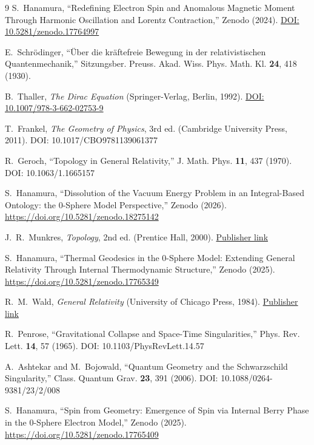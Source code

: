 \documentclass[%
 reprint,
 amsmath,amssymb,
 aps,
 prb,
]{revtex4-2}
\numberwithin{equation}{section}
\begin{document}
\begin{thebibliography}{9}
S.~Hanamura,
``Redefining Electron Spin and Anomalous Magnetic Moment Through Harmonic Oscillation and Lorentz Contraction,''
Zenodo (2024).
\href{https://doi.org/10.5281/zenodo.17764997}{DOI: 10.5281/zenodo.17764997}

E.~Schrödinger,
``Über die kräftefreie Bewegung in der relativistischen Quantenmechanik,''
Sitzungsber. Preuss. Akad. Wiss. Phys. Math. Kl. \textbf{24}, 418 (1930).

B.~Thaller,
\textit{The Dirac Equation}
(Springer-Verlag, Berlin, 1992).
\href{https://doi.org/10.1007/978-3-662-02753-9}{DOI: 10.1007/978-3-662-02753-9}

T.~Frankel,
\textit{The Geometry of Physics},
3rd ed. (Cambridge University Press, 2011).  
DOI: 10.1017/CBO9781139061377

R.~Geroch,
``Topology in General Relativity,''
J. Math. Phys. \textbf{11}, 437 (1970).  
DOI: 10.1063/1.1665157

S.~Hanamura, ``Dissolution of the Vacuum Energy Problem in an Integral-Based Ontology: the 0-Sphere Model Perspective,'' Zenodo (2026). \href{https://doi.org/10.5281/zenodo.18275142}{https://doi.org/10.5281/zenodo.18275142}

J.~R.~Munkres,
\textit{Topology},
2nd ed. (Prentice Hall, 2000).  
\href{https://www.pearson.com/en-us/subject-catalog/p/topology/P200000003295}{Publisher link}

S.~Hanamura, ``Thermal Geodesics in the 0-Sphere Model: Extending General Relativity Through Internal Thermodynamic Structure,'' Zenodo (2025). \href{https://doi.org/10.5281/zenodo.17765349}{https://doi.org/10.5281/zenodo.17765349}

R.~M.~Wald,
\textit{General Relativity}
(University of Chicago Press, 1984).  
\href{https://press.uchicago.edu/ucp/books/book/chicago/G/bo3684313.html}{Publisher link}

R.~Penrose,
``Gravitational Collapse and Space-Time Singularities,''
Phys. Rev. Lett. \textbf{14}, 57 (1965).  
DOI: 10.1103/PhysRevLett.14.57

A.~Ashtekar and M.~Bojowald,
``Quantum Geometry and the Schwarzschild Singularity,''
Class. Quantum Grav. \textbf{23}, 391 (2006).  
DOI: 10.1088/0264-9381/23/2/008

S.~Hanamura, ``Spin from Geometry: Emergence of Spin via Internal Berry Phase in the 0-Sphere Electron Model,'' Zenodo (2025). \href{https://doi.org/10.5281/zenodo.17765409}{https://doi.org/10.5281/zenodo.17765409}


\end{thebibliography}
\end{document}
